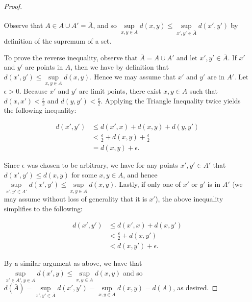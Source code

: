 \begin{proof}\ \\\\
    Observe that $A \in A \cup A' = \bar{A}$, and so 
    $\sup\limits_{x,y \in A}{d(x, y)} \le \sup\limits_{x',y' \in \bar{A}}{d(x', y')}$
    by definition of the supremum of a set.

    To prove the reverse inequality, observe that $\bar{A} = A \cup A'$ and let $x', y' \in \bar{A}$. If $x'$ and $y'$ 
    are points in $A$, then we have by definition that $d(x', y') \le \sup\limits_{x,y \in A}{d(x, y)}$. Hence we may 
    assume that $x'$ and $y'$ are in $A'$. Let $\epsilon > 0$. Because $x'$ and $y'$ are limit points, there exist 
    $x, y \in A$ such that $d(x, x') < \frac{\epsilon}{2}$ and $d(y, y') < \frac{\epsilon}{2}$. Applying the Triangle
    Inequality twice yields the following inequality:

    \begin{align*}
        d(x', y') &\le d(x', x) + d(x, y) + d(y, y') \\
                  &< \frac{\epsilon}{2} + d(x, y) + \frac{\epsilon}{2} \\
                  &= d(x, y) + \epsilon.
    \end{align*}

    Since $\epsilon$ was chosen to be arbitrary, we have for any points $x', y' \in A'$ that $d(x', y') \le d(x, y)$ for
    some $x, y \in A$, and hence $\sup\limits_{x',y' \in A'}{d(x', y')} \le \sup\limits_{x,y \in A}{d(x, y)}$. Lastly, if
    only one of $x'$ or $y'$ is in $A'$ (we may assume without loss of generality that it is $x'$), the above inequality
    simplifies to the following:
    
    \begin{align*}
        d(x', y') &\le d(x', x) + d(x, y') \\
                  &< \frac{\epsilon}{2} + d(x, y') \\
                  &< d(x, y') + \epsilon.
    \end{align*}

    By a similar argument as above, we have that
    $\sup\limits_{x' \in A', y \in A}{d(x', y)} \le \sup\limits_{x,y \in A}{d(x, y)}$ and so
    $d(\bar{A}) = \sup\limits_{x', y' \in \bar{A}}{d(x', y')} = \sup\limits_{x,y \in A}{d(x, y)} = d(A)$, as desired.
\end{proof}

\pagebreak